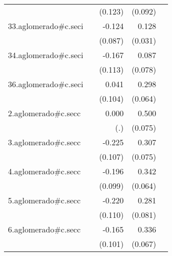 {\begin{longtable}{l*{4}{D{.}{.}{-1}}}
            &                     &     (0.123)         &     (0.092)         &                     \\
\addlinespace
33.aglomerado#c.seci&                     &      -0.124         &       0.128\sym{***}&                     \\
            &                     &     (0.087)         &     (0.031)         &                     \\
\addlinespace
34.aglomerado#c.seci&                     &      -0.167         &       0.087         &                     \\
            &                     &     (0.113)         &     (0.078)         &                     \\
\addlinespace
36.aglomerado#c.seci&                     &       0.041         &       0.298\sym{***}&                     \\
            &                     &     (0.104)         &     (0.064)         &                     \\
\addlinespace
2.aglomerado#c.secc&                     &       0.000         &       0.500\sym{***}&                     \\
            &                     &         (.)         &     (0.075)         &                     \\
\addlinespace
3.aglomerado#c.secc&                     &      -0.225\sym{*}  &       0.307\sym{***}&                     \\
            &                     &     (0.107)         &     (0.075)         &                     \\
\addlinespace
4.aglomerado#c.secc&                     &      -0.196\sym{*}  &       0.342\sym{***}&                     \\
            &                     &     (0.099)         &     (0.064)         &                     \\
\addlinespace
5.aglomerado#c.secc&                     &      -0.220\sym{*}  &       0.281\sym{***}&                     \\
            &                     &     (0.110)         &     (0.081)         &                     \\
\addlinespace
6.aglomerado#c.secc&                     &      -0.165         &       0.336\sym{***}&                     \\
            &                     &     (0.101)         &     (0.067)         &                     \\

\end{longtable}}
